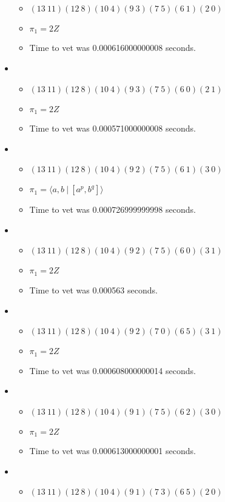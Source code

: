 \documentclass{article}
\begin{document}
\begin{itemize}
\begin{itemize}
      \item $(13\ 11)(12\ 8)(10\ 4)(9\ 3)(7\ 5)(6\ 1)(2\ 0)$
      \item $\pi_1 =2 Z$
      \item Time to vet was 0.000616000000008 seconds.
\end{itemize}
\item \begin{itemize}
      \item $(13\ 11)(12\ 8)(10\ 4)(9\ 3)(7\ 5)(6\ 0)(2\ 1)$
      \item $\pi_1 =2 Z$
      \item Time to vet was 0.000571000000008 seconds.
\end{itemize}
\item \begin{itemize}
      \item $(13\ 11)(12\ 8)(10\ 4)(9\ 2)(7\ 5)(6\ 1)(3\ 0)$
      \item $\pi_1 = \langle a,b\ |\ [a^p,b^q]\rangle$
      \item Time to vet was 0.000726999999998 seconds.
\end{itemize}
\item \begin{itemize}
      \item $(13\ 11)(12\ 8)(10\ 4)(9\ 2)(7\ 5)(6\ 0)(3\ 1)$
      \item $\pi_1 =2 Z$
      \item Time to vet was 0.000563 seconds.
\end{itemize}
\item \begin{itemize}
      \item $(13\ 11)(12\ 8)(10\ 4)(9\ 2)(7\ 0)(6\ 5)(3\ 1)$
      \item $\pi_1 =2 Z$
      \item Time to vet was 0.000608000000014 seconds.
\end{itemize}
\item \begin{itemize}
      \item $(13\ 11)(12\ 8)(10\ 4)(9\ 1)(7\ 5)(6\ 2)(3\ 0)$
      \item $\pi_1 =2 Z$
      \item Time to vet was 0.000613000000001 seconds.
\end{itemize}
\item \begin{itemize}
      \item $(13\ 11)(12\ 8)(10\ 4)(9\ 1)(7\ 3)(6\ 5)(2\ 0)$

\end{itemize}
\end{itemize}
\end{document}
